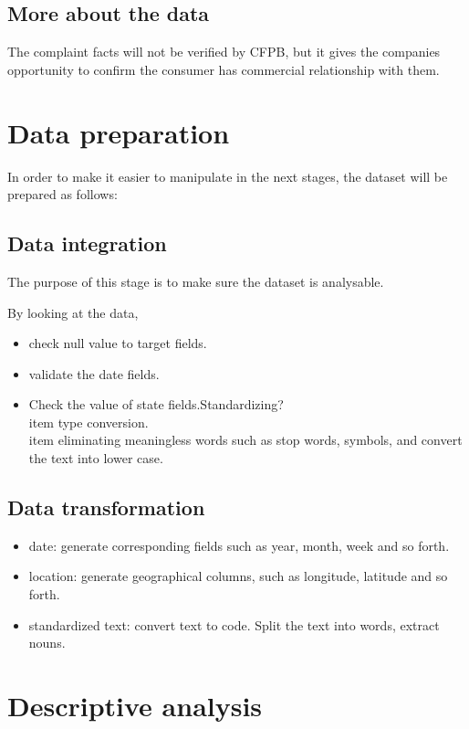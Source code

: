 \documentclass[conference]{IEEEtran}
\begin{document}
\subsection{More about the data}\label{AA}
The complaint facts will not be verified by CFPB, but it gives the companies opportunity to confirm the consumer has commercial relationship with them. 



\section{Data preparation}\label{AA}
In order to make it easier to manipulate in the next stages, the dataset will be prepared as follows:

\subsection{Data integration}\label{AA}
The purpose of this stage is to make sure the dataset is analysable.

By looking at the data, 
\begin{itemize}
\item check null value to target fields.
\item validate the date fields.
\item Check the value of state fields.Standardizing?
\\item type conversion.
\\item eliminating meaningless words such as stop words, symbols, and convert the text into lower case.
\end{itemize}



\subsection{Data transformation}\label{AA}
\begin{itemize}

\item date: generate corresponding fields such as year, month, week and so forth.
\item location: generate geographical columns, such as longitude, latitude and so forth.
\item standardized text: convert text to code. Split the text into words, extract nouns.
\end{itemize}


\section{Descriptive analysis }
\end{document}
